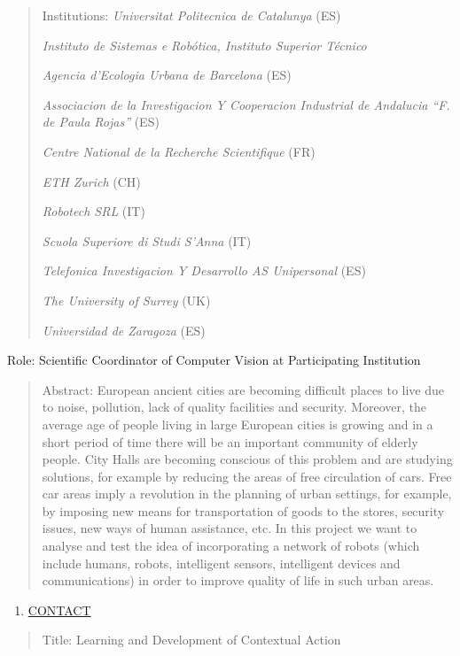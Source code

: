 \documentclass[
]{article}
\begin{document}
\begin{quote}
Institutions: \emph{Universitat Politecnica de Catalunya} (ES)

\emph{Instituto de Sistemas e Robótica, Instituto Superior Técnico}

\emph{Agencia d'Ecologia Urbana de Barcelona} (ES)

\emph{Associacion de la Investigacion Y Cooperacion Industrial de
Andalucia ``F. de Paula Rojas''} (ES)

\emph{Centre National de la Recherche Scientifique} (FR)

\emph{ETH Zurich} (CH)

\emph{Robotech SRL} (IT)

\emph{Scuola Superiore di Studi S'Anna} (IT)

\emph{Telefonica Investigacion Y Desarrollo AS Unipersonal} (ES)

\emph{The University of Surrey} (UK)

\emph{Universidad de Zaragoza} (ES)
\end{quote}

Role: Scientific Coordinator of Computer Vision at Participating
Institution

\begin{quote}
Abstract: European ancient cities are becoming difficult places to live
due to noise, pollution, lack of quality facilities and security.
Moreover, the average age of people living in large European cities is
growing and in a short period of time there will be an important
community of elderly people. City Halls are becoming conscious of this
problem and are studying solutions, for example by reducing the areas of
free circulation of cars. Free car areas imply a revolution in the
planning of urban settings, for example, by imposing new means for
transportation of goods to the stores, security issues, new ways of
human assistance, etc. In this project we want to analyse and test the
idea of incorporating a network of robots (which include humans, robots,
intelligent sensors, intelligent devices and communications) in order to
improve quality of life in such urban areas.
\end{quote}

\begin{enumerate}
\def\labelenumi{\arabic{enumi}.}
\setcounter{enumi}{13}
\item
  \ul{CONTACT}
\end{enumerate}

\begin{quote}
Title: Learning and Development of Contextual Action
\end{quote}
\end{document}
